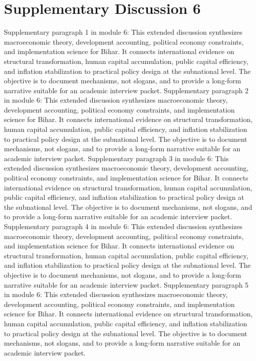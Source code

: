 \documentclass[preprint,12pt]{elsarticle}
\begin{document}
\section{Supplementary Discussion 6}
Supplementary paragraph 1 in module 6: This extended discussion synthesizes macroeconomic theory, development accounting, political economy constraints, and implementation science for Bihar. It connects international evidence on structural transformation, human capital accumulation, public capital efficiency, and inflation stabilization to practical policy design at the subnational level. The objective is to document mechanisms, not slogans, and to provide a long-form narrative suitable for an academic interview packet.
Supplementary paragraph 2 in module 6: This extended discussion synthesizes macroeconomic theory, development accounting, political economy constraints, and implementation science for Bihar. It connects international evidence on structural transformation, human capital accumulation, public capital efficiency, and inflation stabilization to practical policy design at the subnational level. The objective is to document mechanisms, not slogans, and to provide a long-form narrative suitable for an academic interview packet.
Supplementary paragraph 3 in module 6: This extended discussion synthesizes macroeconomic theory, development accounting, political economy constraints, and implementation science for Bihar. It connects international evidence on structural transformation, human capital accumulation, public capital efficiency, and inflation stabilization to practical policy design at the subnational level. The objective is to document mechanisms, not slogans, and to provide a long-form narrative suitable for an academic interview packet.
Supplementary paragraph 4 in module 6: This extended discussion synthesizes macroeconomic theory, development accounting, political economy constraints, and implementation science for Bihar. It connects international evidence on structural transformation, human capital accumulation, public capital efficiency, and inflation stabilization to practical policy design at the subnational level. The objective is to document mechanisms, not slogans, and to provide a long-form narrative suitable for an academic interview packet.
Supplementary paragraph 5 in module 6: This extended discussion synthesizes macroeconomic theory, development accounting, political economy constraints, and implementation science for Bihar. It connects international evidence on structural transformation, human capital accumulation, public capital efficiency, and inflation stabilization to practical policy design at the subnational level. The objective is to document mechanisms, not slogans, and to provide a long-form narrative suitable for an academic interview packet.
\end{document}

